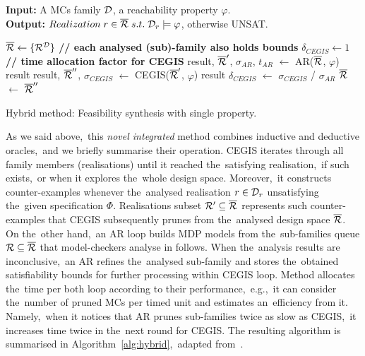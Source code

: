 \begin{algorithm}[H]
\hspace*{\algorithmicindent} \textbf{Input:} A MCs family $\mathcal{D}$, a reachability property $\varphi$. \\
\hspace*{\algorithmicindent} \textbf{Output:} $Realization\; r \in \overline{\mathcal{R}} \; s.t. \; \mathcal{D}_r \models \varphi$, otherwise UNSAT. \\
\vspace*{-1.5em}
\begin{algorithmic}[1]
    \STATE $\overline{\mathcal{R}} \leftarrow \{ \mathcal{R}^{\mathcal{D}} \}$ \hfill \textbf{// each analysed (sub)-family also holds bounds}
    \STATE $\delta_{CEGIS} \leftarrow 1$ \hfill \textbf{// time allocation factor for CEGIS}
    \WHILE{$\rlzf \neq \emptyset$}
        \STATE result, $\overline{\mathcal{R}}'$, $\sigma_{AR}$, $t_{AR}$ $\leftarrow$ AR($\overline{\mathcal{R}}$, $\varphi$)
            \RETURN result
        \ELSE
            \STATE result, $\overline{\mathcal{R}}''$, $\sigma_{CEGIS}$ $\leftarrow$ CEGIS($\overline{\mathcal{R}}'$, $\varphi$)
                \RETURN result
            \ELSE
                \STATE $\delta_{CEGIS}$ $\leftarrow$ $\sigma_{CEGIS}$ / $\sigma_{AR}$
                \STATE $\overline{\mathcal{R}}$ $\leftarrow$ $\overline{\mathcal{R}}''$
            \ENDIF
        \ENDIF
    \ENDWHILE
\end{algorithmic}
\caption{Hybrid method: Feasibility synthesis with single property.}
\label{alg:hybrid}
\end{algorithm}

As we said above,~this \textit{novel integrated} method combines inductive and deductive oracles,~and we briefly summarise their operation.
CEGIS iterates through all family members (realisations) until it reached the~satisfying realisation,~if such exists,~or when it explores the~whole design space.
Moreover,~it constructs counter-examples whenever the~analysed realisation $r \in \mathcal{D}_r$ unsatisfying the~given specification $\varPhi$.
Realisations subset $\mathcal{R}' \subseteq \overline{\mathcal{R}}$ represents such counter-examples that CEGIS subsequently prunes from the~analysed design space $\overline{\mathcal{R}}$.
On the~other hand,~an AR loop builds MDP models from the~sub-families queue $\mathcal{R} \subseteq \overline{\mathcal{R}}$ that model-checkers analyse in follows.
When the~analysis results are inconclusive,~an AR refines the~analysed sub-family and  stores the~obtained satisfiability bounds for further processing within CEGIS loop.
Method allocates the~time per both loop according to their performance,~e.g.,~it can consider the~number of pruned MCs per timed unit and estimates an~efficiency from it.
Namely,~when it notices that AR prunes sub-families twice as slow as CEGIS,~it increases time twice in the~next round for CEGIS.
The resulting algorithm is summarised in Algorithm~\ref{alg:hybrid},~adapted from~\cite{tacas21}.


